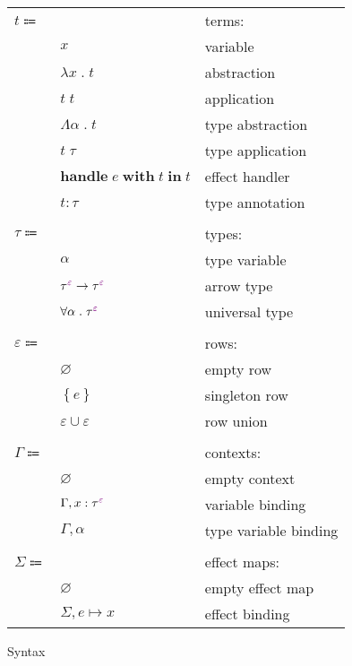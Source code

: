 \documentclass[12pt]{article}
\newcommand\anno[2]{#1 : #2}
\newcommand\term{t}
\newcommand\eVar{x}
\newcommand\eAbs[2]{\lambda #1 \; . \; #2}
\newcommand\eApp[2]{#1 \; #2}
\newcommand\eTAbs[2]{\Lambda #1 \; . \; #2}
\newcommand\eTApp[2]{#1 \; #2}
\newcommand\eHandle[3]{\textbf{handle} \; #1 \; \textbf{with} \; #2 \; \textbf{in} \; #3}
\newcommand\eAnno[2]{\anno{#1}{#2}}
\newcommand\type{\tau}
\newcommand\tVar{\alpha}
\newcommand\tArrow[4]{\tEmbellished{#1}{#2} \rightarrow \tEmbellished{#3}{#4}}
\newcommand\tForall[3]{\forall #1 \; . \; \tEmbellished{#2}{#3}}
\newcommand\tEmbellished[2]{{#1}^{\textcolor{violet}{#2}}}
\newcommand\row{\varepsilon}
\newcommand\rEmpty{\varnothing}
\newcommand\rSingleton[1]{\left\{ #1 \right\}}
\newcommand\rUnion[2]{#1 \cup #2}
\newcommand\context{\Gamma}
\newcommand\cEmpty{\varnothing}
\newcommand\cTExtend[4]{#1, \anno{#2}{\tEmbellished{#3}{#4}}}
\newcommand\cKExtend[2]{#1, #2}
\newcommand\effect{e}
\newcommand\effectMap{\Sigma}
\newcommand\emMap[2]{#1 \mapsto #2}
\newcommand\emEmpty{\varnothing}
\newcommand\emExtend[3]{#1, \emMap{#2}{#3}}
\begin{document}
      \begin{figure}[H]
        \begin{mdframed}[backgroundcolor=none]
          \begin{center}
            \begin{tabular}{l l l}
              $\term \Coloneqq$ & & terms: \\
              & $\eVar$ & variable \\
              & $\eAbs{\eVar}{\term}$ & abstraction \\
              & $\eApp{\term}{\term}$ & application \\
              & $\eTAbs{\tVar}{\term}$ & type abstraction \\
              & $\eTApp{\term}{\type}$ & type application \\
              & $\eHandle{\effect}{\term}{\term}$ & effect handler \\
              & $\eAnno{\term}{\type}$ & type annotation \\
              \\
              $\type \Coloneqq$ & & types: \\
              & $\tVar$ & type variable \\
              & $\tArrow{\type}{\row}{\type}{\row}$ & arrow type \\
              & $\tForall{\tVar}{\type}{\row}$ & universal type \\
              \\
              $\row \Coloneqq$ & & rows: \\
              & $\rEmpty$ & empty row \\
              & $\rSingleton{\effect}$ & singleton row \\
              & $\rUnion{\row}{\row}$ & row union \\
              \\
              $\context \Coloneqq$ & & contexts: \\
              & $\cEmpty$ & empty context \\
              & $\cTExtend{\context}{\eVar}{\type}{\row}$ & variable binding \\
              & $\cKExtend{\context}{\tVar}$ & type variable binding \\
              \\
              $\effectMap \Coloneqq$ & & effect maps: \\
              & $\emEmpty$ & empty effect map \\
              & $\emExtend{\effectMap}{\effect}{\eVar}$ & effect binding \\
            \end{tabular}
          \end{center}

          \caption{Syntax}\label{fig:syntax}
        \end{mdframed}
      \end{figure}
\end{document}
